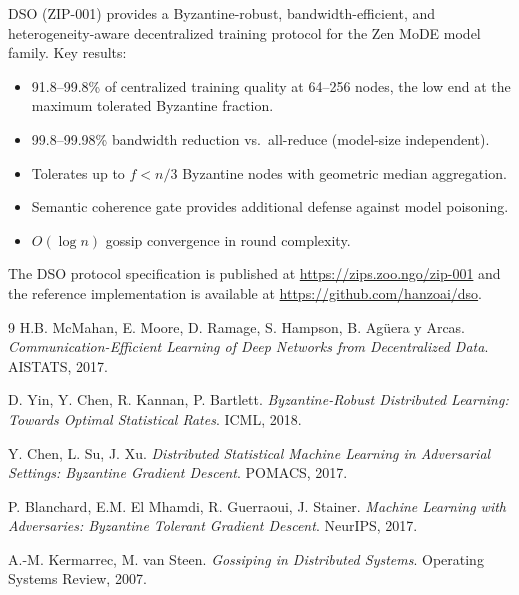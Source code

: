 \documentclass[11pt,a4paper]{article}
\begin{document}
DSO (ZIP-001) provides a Byzantine-robust, bandwidth-efficient, and heterogeneity-aware
decentralized training protocol for the Zen MoDE model family. Key results:

\begin{itemize}
    \item 91.8--99.8\% of centralized training quality at 64--256 nodes,
          the low end at the maximum tolerated Byzantine fraction.

    \item 99.8--99.98\% bandwidth reduction vs.\ all-reduce (model-size independent).
    \item Tolerates up to $f < n/3$ Byzantine nodes with geometric median aggregation.
    \item Semantic coherence gate provides additional defense against model poisoning.
    \item $O(\log n)$ gossip convergence in round complexity.
\end{itemize}

The DSO protocol specification is published at \url{https://zips.zoo.ngo/zip-001}
and the reference implementation is available at \url{https://github.com/hanzoai/dso}.

\begin{thebibliography}{9}
H.B. McMahan, E. Moore, D. Ramage, S. Hampson, B. Agüera y Arcas.
\textit{Communication-Efficient Learning of Deep Networks from Decentralized Data}.
AISTATS, 2017.

D. Yin, Y. Chen, R. Kannan, P. Bartlett.
\textit{Byzantine-Robust Distributed Learning: Towards Optimal Statistical Rates}.
ICML, 2018.

Y. Chen, L. Su, J. Xu.
\textit{Distributed Statistical Machine Learning in Adversarial Settings: Byzantine Gradient Descent}.
POMACS, 2017.

P. Blanchard, E.M. El Mhamdi, R. Guerraoui, J. Stainer.
\textit{Machine Learning with Adversaries: Byzantine Tolerant Gradient Descent}.
NeurIPS, 2017.

A.-M. Kermarrec, M. van Steen.
\textit{Gossiping in Distributed Systems}.
Operating Systems Review, 2007.
\end{thebibliography}
\end{document}
